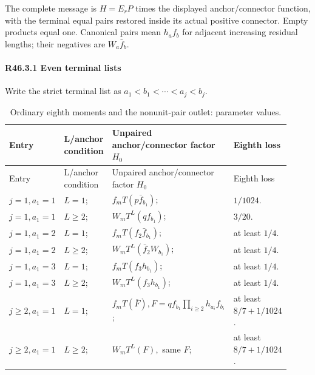The complete message is \(H=E_rP\) times the displayed anchor/connector
function, with the terminal equal pairs restored inside its actual
positive connector. Empty products equal one. Canonical pairs mean
\(h_a f_b\) for adjacent increasing residual lengths; their negatives
are \(W_a \bar f_b.\)

\paragraph{R46.3.1 Even terminal lists}

Write the strict terminal list as \(a_1<b_1<\cdots<a_j<b_j.\)


\begingroup\small
\setlength{\tabcolsep}{3pt}
\setlength{\LTleft}{0pt}\setlength{\LTright}{\fill}
\begin{longtable}{@{}p{0.2200\linewidth}p{0.2333\linewidth}p{0.2333\linewidth}p{0.2333\linewidth}@{}}
\caption{Ordinary eighth moments and the nonunit-pair outlet: parameter values.}\label{tab:parameters:r2-c046:1}\\
\toprule
Entry & L/anchor condition & Unpaired anchor/connector factor \(H_0\) & Eighth loss \\
\midrule\endfirsthead
\toprule
Entry & L/anchor condition & Unpaired anchor/connector factor \(H_0\) & Eighth loss \\
\midrule\endhead
\bottomrule\endfoot
\(j=1,\allowbreak a_{1}=1\) & \(L=1\); & \(f_m T(p \bar f_{b_1})\); & \(1/1024\). \\
\addlinespace[2pt]
\(j=1,\allowbreak a_{1}=1\) & \(L\ge 2\); & \(W_m T^L(q f_{b_1})\); & \(3/20\). \\
\addlinespace[2pt]
\(j=1,\allowbreak a_{1}=2\) & \(L=1\); & \(f_m T(f_{2} \bar f_{b_1})\); & at least \(1/4\). \\
\addlinespace[2pt]
\(j=1,\allowbreak a_{1}=2\) & \(L\ge 2\); & \(W_m T^L(\bar f_2 W_{b_1})\); & at least \(1/4\). \\
\addlinespace[2pt]
\(j=1,\allowbreak a_{1}=3\) & \(L=1\); & \(f_m T(f_{3} h_{b_1})\); & at least \(1/4\). \\
\addlinespace[2pt]
\(j=1,\allowbreak a_{1}=3\) & \(L\ge 2\); & \(W_m T^L(f_{3} h_{b_1})\); & at least \(1/4\). \\
\addlinespace[2pt]
\(j\ge 2,\allowbreak a_{1}=1\) & \(L=1\); & \(f_m T(\overline{F}),\allowbreak  F=q f_{b_1} \prod_{i\ge 2}h_{a_i} f_{b_i}\); & at least \(8/7+1/1024\). \\
\addlinespace[2pt]
\(j\ge 2,\allowbreak a_{1}=1\) & \(L\ge 2\); & \(W_m T^L(F),\allowbreak \) same \(F\); & at least \(8/7+1/1024\). \\

\end{longtable}
